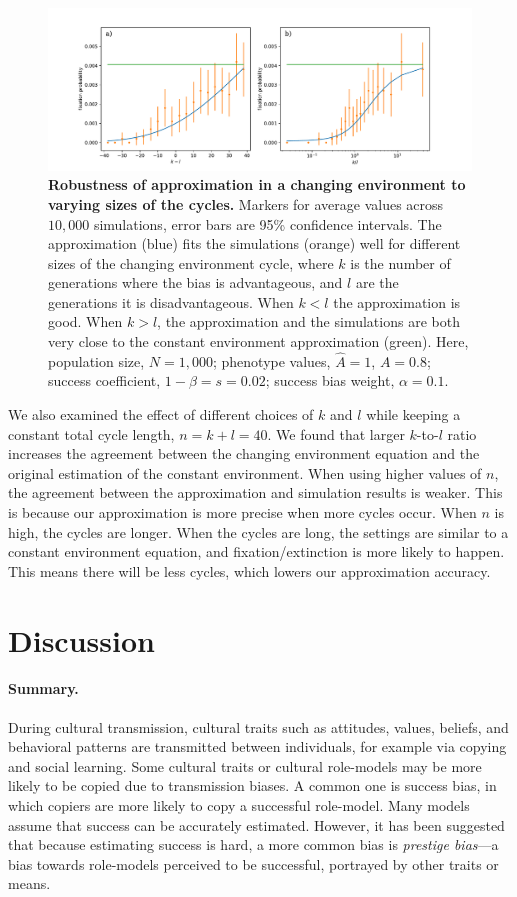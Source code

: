 \documentclass[12pt]{extarticle}
\begin{document}
\begin{figure}[h]
    \includegraphics[width=\linewidth]{../figures/changed_env/ch_env_var_k_l.pdf}
  \caption{\textbf{Robustness of approximation in a changing environment to varying sizes of the cycles.} 
Markers for average values across $10,000$ simulations, error bars are 95\% confidence intervals.
The approximation (blue) fits the simulations (orange) well for different sizes of the changing environment cycle, where $k$ is the number of generations where the bias is advantageous, and $l$ are the generations it is disadvantageous.
   When $k<l$ the approximation is good. When $k>l$, the approximation and the simulations are both very close to the constant environment approximation (green). 
 Here, population size, $N=1,000$; phenotype values, $\hat{A}=1$, $A=0.8$; success coefficient, $1-\beta=s=0.02$; success bias weight, $\alpha=0.1$.}
  \label{fig:ch_env_k_l}
\end{figure}

We also examined the effect of different choices of $k$ and $l$ while keeping a constant total cycle length, $n=k+l=40$.
We found that larger $k$-to-$l$ ratio increases the agreement between the changing environment equation and the original estimation of the constant environment. 
When using higher values of $n$, the agreement between the approximation and simulation results is weaker.
This is because our approximation is more precise when more cycles occur.
When $n$ is high, the cycles are longer. When the cycles are long, the settings are similar to a constant environment equation, and fixation/extinction is more likely to happen. This means there will be less cycles, which lowers our approximation accuracy.

\section*{Discussion}
\paragraph{Summary.}
During cultural transmission, cultural traits such as attitudes, values, beliefs, and behavioral patterns are transmitted between individuals, for example via copying and social learning.
Some cultural traits or cultural role-models may be more likely to be copied due to transmission biases. 
A common one is success bias, in which copiers are more likely to copy a successful role-model. Many models assume that success can be accurately estimated.
However, it has been suggested \citep{complexityPaper} that because estimating success is hard, a more common bias is \textit{prestige bias}---a bias towards role-models perceived to be successful, portrayed by other traits or means.
\end{document}
